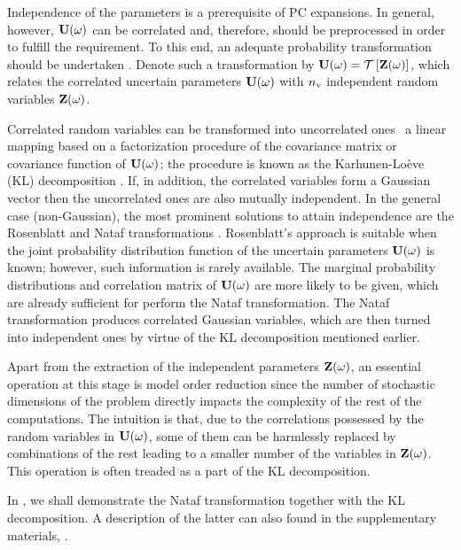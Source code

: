Independence of the parameters is a prerequisite of PC expansions.
In general, however, $\mathbf{U}(\omega)$ can be correlated and, therefore, should be preprocessed in order to fulfill the requirement.
To this end, an adequate probability transformation should be undertaken \cite{eldred2008}.
Denote such a transformation by $\vU(\o) = \oTransform{\vZ(\o)}$, which relates the correlated uncertain parameters $\mathbf{U}(\omega)$ with ${n_\text{v}}$ independent random variables $\mathbf{Z}(\omega)$.

Correlated random variables can be transformed into uncorrelated ones \via\ a linear mapping based on a factorization procedure of the covariance matrix or covariance function of $\mathbf{U}(\omega)$; the procedure is known as the Karhunen-Lo\`{e}ve (KL) decomposition \cite{ghanem1991}.
If, in addition, the correlated variables form a Gaussian vector then the uncorrelated ones are also mutually independent.
In the general case (non-Gaussian), the most prominent solutions to attain independence are the Rosenblatt \cite{rosenblatt1952} and Nataf transformations \cite{li2008}.
Rosenblatt's approach is suitable when the joint probability distribution function of the uncertain parameters $\mathbf{U}(\omega)$ is known; however, such information is rarely available.
The marginal probability distributions and correlation matrix of $\mathbf{U}(\omega)$ are more likely to be given, which are already sufficient for perform the Nataf transformation.
The Nataf transformation produces correlated Gaussian variables, which are then turned into independent ones by virtue of the KL decomposition mentioned earlier.

Apart from the extraction of the independent parameters $\mathbf{Z}(\omega)$, an essential operation at this stage is model order reduction since the number of stochastic dimensions of the problem directly impacts the complexity of the rest of the computations.
The intuition is that, due to the correlations possessed by the random variables in $\mathbf{U}(\omega)$, some of them can be harmlessly replaced by combinations of the rest leading to a smaller number of the variables in $\mathbf{Z}(\omega)$.
This operation is often treaded as a part of the KL decomposition.

In , we shall demonstrate the Nataf transformation together with the KL decomposition.
A description of the latter can also found in the supplementary materials, .
